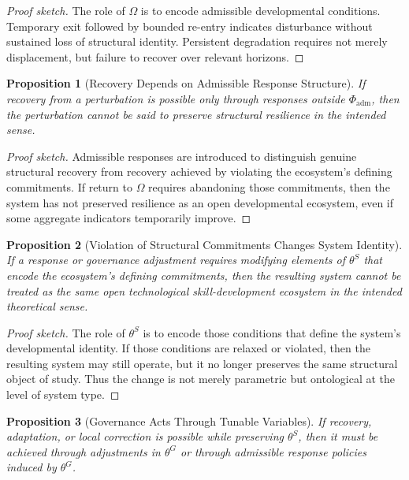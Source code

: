 \documentclass[11pt]{article}
\newtheorem{proposition}{Proposition}
\begin{document}
\begin{proof}[Proof sketch]
The role of \(\Omega\) is to encode admissible developmental conditions. Temporary exit followed by bounded re-entry indicates disturbance without sustained loss of structural identity. Persistent degradation requires not merely displacement, but failure to recover over relevant horizons.
\end{proof}

\begin{proposition}[Recovery Depends on Admissible Response Structure]
If recovery from a perturbation is possible only through responses outside \(\Phi_{\mathrm{adm}}\), then the perturbation cannot be said to preserve structural resilience in the intended sense.
\end{proposition}

\begin{proof}[Proof sketch]
Admissible responses are introduced to distinguish genuine structural recovery from recovery achieved by violating the ecosystem's defining commitments. If return to \(\Omega\) requires abandoning those commitments, then the system has not preserved resilience as an open developmental ecosystem, even if some aggregate indicators temporarily improve.
\end{proof}

\begin{proposition}[Violation of Structural Commitments Changes System Identity]
If a response or governance adjustment requires modifying elements of \(\theta^{S}\) that encode the ecosystem's defining commitments, then the resulting system cannot be treated as the same open technological skill-development ecosystem in the intended theoretical sense.
\end{proposition}

\begin{proof}[Proof sketch]
The role of \(\theta^{S}\) is to encode those conditions that define the system's developmental identity. If those conditions are relaxed or violated, then the resulting system may still operate, but it no longer preserves the same structural object of study. Thus the change is not merely parametric but ontological at the level of system type.
\end{proof}

\begin{proposition}[Governance Acts Through Tunable Variables]
If recovery, adaptation, or local correction is possible while preserving \(\theta^{S}\), then it must be achieved through adjustments in \(\theta^{G}\) or through admissible response policies induced by \(\theta^{G}\).
\end{proposition}
\end{document}
